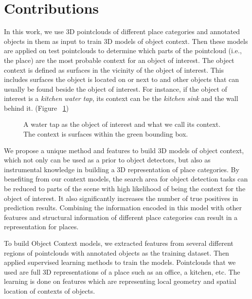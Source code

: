 \section {Contributions}
\label{Contributions.sec}
In this work, we use 3D pointclouds of different place categories and annotated objects in them as input to train 3D models of object context. Then these models are applied on test pointclouds to determine which parts of the pointcloud (i.e., the place) are the most probable context for an object of interest. The object context is defined as surfaces in the vicinity of the object of interest. This includes surfaces the object is located on or next to and other objects that can usually be found beside the object of interest. 
For instance, if the object of interest is a \textit{kitchen water tap}, its context can be the 
\textit{kitchen sink} and the wall behind it. (Figure ~\ref{contextExample.figure})

\begin{figure}[t]
  \caption[Illustration of a sample Context.]
  {A water tap as the object of interest and what we call its context. The context is surfaces within the green 
  bounding box.}
  \label{contextExample.figure}
\end{figure}

We propose a unique method and features to build 3D models of object context, which not only can be used as a prior to 
object detectors, but also as instrumental knowledge in building a 3D representation of place categories. 
By benefiting from our context models, the search area for object detection tasks can be reduced to parts of the scene with high 
likelihood of being the context for the object of interest. 
It also significantly increases the number of true positives in prediction results. 
Combining the information encoded in this model with other features and structural information of different place categories can 
result in a representation for places.
 
 To build Object Context models, we extracted features from several different regions of pointclouds with annotated objects as the training dataset. Then applied supervised learning methods to train the models. Pointclouds that we used are full 3D representations of a place such as an office, a kitchen, etc. 
 The learning is done on features which are representing local geometry and spatial location of contexts of objects.
 
